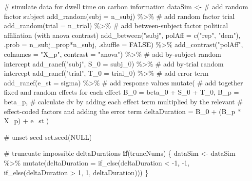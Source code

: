 \documentclass[
  letterpaper,
  DIV=11,
  numbers=noendperiod]{scrartcl}
\newenvironment{Shaded}{\begin{snugshade}}{\end{snugshade}}
\newcommand{\AttributeTok}[1]{\textcolor[rgb]{0.40,0.45,0.13}{#1}}
\newcommand{\CommentTok}[1]{\textcolor[rgb]{0.37,0.37,0.37}{#1}}
\newcommand{\ConstantTok}[1]{\textcolor[rgb]{0.56,0.35,0.01}{#1}}
\newcommand{\ControlFlowTok}[1]{\textcolor[rgb]{0.00,0.23,0.31}{\textbf{#1}}}
\newcommand{\DecValTok}[1]{\textcolor[rgb]{0.68,0.00,0.00}{#1}}
\newcommand{\FunctionTok}[1]{\textcolor[rgb]{0.28,0.35,0.67}{#1}}
\newcommand{\NormalTok}[1]{\textcolor[rgb]{0.00,0.23,0.31}{#1}}
\newcommand{\OtherTok}[1]{\textcolor[rgb]{0.00,0.23,0.31}{#1}}
\newcommand{\SpecialCharTok}[1]{\textcolor[rgb]{0.37,0.37,0.37}{#1}}
\newcommand{\StringTok}[1]{\textcolor[rgb]{0.13,0.47,0.30}{#1}}
\begin{document}
\begin{Shaded}
\begin{Highlighting}[]
  \CommentTok{\# simulate data for dwell time on carbon information}
\NormalTok{  dataSim }\OtherTok{\textless{}{-}} 
    \CommentTok{\# add random factor subject}
    \FunctionTok{add\_random}\NormalTok{(}\AttributeTok{subj =}\NormalTok{ n\_subj) }\SpecialCharTok{\%\textgreater{}\%} 
    \CommentTok{\# add random factor trial}
    \FunctionTok{add\_random}\NormalTok{(}\AttributeTok{trial =}\NormalTok{ n\_trial) }\SpecialCharTok{\%\textgreater{}\%} 
    \CommentTok{\# add between{-}subject factor political affiliation (with anova contrast)}
    \FunctionTok{add\_between}\NormalTok{(}\StringTok{"subj"}\NormalTok{, }\AttributeTok{polAff =} \FunctionTok{c}\NormalTok{(}\StringTok{"rep"}\NormalTok{, }\StringTok{"dem"}\NormalTok{), }\AttributeTok{.prob =}\NormalTok{ n\_subj\_prop}\SpecialCharTok{*}\NormalTok{n\_subj, }\AttributeTok{.shuffle =} \ConstantTok{FALSE}\NormalTok{) }\SpecialCharTok{\%\textgreater{}\%} 
    \FunctionTok{add\_contrast}\NormalTok{(}\StringTok{"polAff"}\NormalTok{, }\AttributeTok{colnames =} \StringTok{"X\_p"}\NormalTok{, }\AttributeTok{contrast =} \StringTok{"anova"}\NormalTok{) }\SpecialCharTok{\%\textgreater{}\%} 
    \CommentTok{\# add by{-}subject random intercept}
    \FunctionTok{add\_ranef}\NormalTok{(}\StringTok{"subj"}\NormalTok{, }\AttributeTok{S\_0 =}\NormalTok{ subj\_0) }\SpecialCharTok{\%\textgreater{}\%} 
    \CommentTok{\# add by{-}trial random intercept}
    \FunctionTok{add\_ranef}\NormalTok{(}\StringTok{"trial"}\NormalTok{, }\AttributeTok{T\_0 =}\NormalTok{ trial\_0) }\SpecialCharTok{\%\textgreater{}\%} 
    \CommentTok{\# add error term}
    \FunctionTok{add\_ranef}\NormalTok{(}\AttributeTok{e\_st =}\NormalTok{ sigma) }\SpecialCharTok{\%\textgreater{}\%} 
    \CommentTok{\# add response values}
    \FunctionTok{mutate}\NormalTok{(}
      \CommentTok{\# add together fixed and random effects for each effect}
      \AttributeTok{B\_0 =}\NormalTok{ beta\_0 }\SpecialCharTok{+}\NormalTok{ S\_0 }\SpecialCharTok{+}\NormalTok{ T\_0,}
      \AttributeTok{B\_p =}\NormalTok{ beta\_p,}
      \CommentTok{\# calculate dv by adding each effect term multiplied by the relevant}
      \CommentTok{\# effect{-}coded factors and adding the error term}
      \AttributeTok{deltaDuration =}\NormalTok{ B\_0 }\SpecialCharTok{+}\NormalTok{ (B\_p }\SpecialCharTok{*}\NormalTok{ X\_p) }\SpecialCharTok{+}\NormalTok{ e\_st}
\NormalTok{    )}
  
  \CommentTok{\# unset seed}
  \FunctionTok{set.seed}\NormalTok{(}\ConstantTok{NULL}\NormalTok{)}
  
  \CommentTok{\# truncuate impossible deltaDurations}
  \ControlFlowTok{if}\NormalTok{(truncNums) \{}
\NormalTok{    dataSim }\OtherTok{\textless{}{-}}\NormalTok{ dataSim }\SpecialCharTok{\%\textgreater{}\%} 
      \FunctionTok{mutate}\NormalTok{(}\AttributeTok{deltaDuration =} \FunctionTok{if\_else}\NormalTok{(deltaDuration }\SpecialCharTok{\textless{}} \SpecialCharTok{{-}}\DecValTok{1}\NormalTok{, }\SpecialCharTok{{-}}\DecValTok{1}\NormalTok{,}
        \FunctionTok{if\_else}\NormalTok{(deltaDuration }\SpecialCharTok{\textgreater{}} \DecValTok{1}\NormalTok{, }\DecValTok{1}\NormalTok{, deltaDuration)))}
\NormalTok{  \}}
  

\end{Highlighting}
\end{Shaded}
\end{document}

